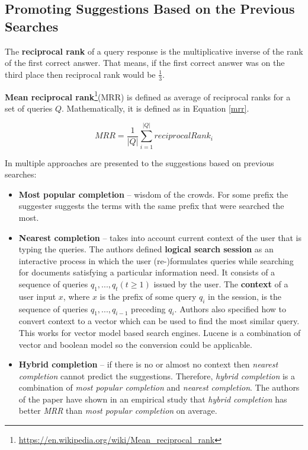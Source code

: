 \subsection{Promoting Suggestions Based on the Previous Searches}
\label{promoting_on_previous_searches}
The \textbf{reciprocal rank} of a query response is the multiplicative inverse of the rank of the first correct answer.
That means, if the first correct answer was on the third place then reciprocal rank would be $\frac{1}{3}$.

\textbf{Mean reciprocal rank}\footnote{\url{https://en.wikipedia.org/wiki/Mean\_reciprocal\_rank}}(MRR) is defined as
average of reciprocal ranks for a set of queries $Q$. Mathematically, it is defined as in Equation \ref{mrr}.

\begin{equation}
\label{mrr}
MRR = \frac{1}{\vert Q \vert} \sum_{i=1}^{\vert Q \vert} reciprocalRank_i
\end{equation}

In \citep{Bar-yossef11context-sensitivequery} multiple approaches are presented to the suggestions based on previous
searches:
\begin{itemize}
    \item \textbf{Most popular completion} – wisdom of the crowds. For some prefix the suggester suggests the terms
    with the same prefix that were searched the most.
    \item \textbf{Nearest completion} – takes into account current context of the user that is typing the queries.
    The authors defined \textbf{logical search session} as an interactive process in which the user (re-)formulates queries
    while searching for documents satisfying a particular information need. It consists of a sequence of
    queries $q_1, . . . , q_t (t \geq 1)$ issued by the user. The \textbf{context} of a user input $x$, where $x$ is the prefix of
    some query $q_i$ in the session, is the sequence of queries $q_1, . . . , q_{i-1}$ preceding $q_i$.
    Authors also specified how to convert context to a vector which can be used to find the most similar query.
    This works for vector model based search engines. Lucene is a combination of vector and boolean model so the
    conversion could be applicable.

    \item \textbf{Hybrid completion} – if there is no or almost no context then \textit{nearest completion} cannot predict the
    suggestions. Therefore, \textit{hybrid completion} is a combination of \textit{most popular completion} and \textit{nearest completion}.
    The authors of the paper have shown in an empirical study that \textit{hybrid completion} has better \textit{MRR} than
    \textit{most popular completion} on average.
\end{itemize}


